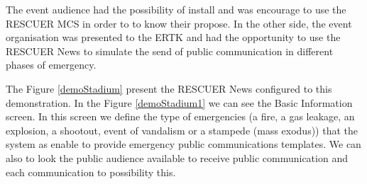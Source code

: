 The event audience had the possibility of install and was encourage to use the RESCUER MCS  in order to to know their propose. In the other side, the event organisation was presented to the ERTK and had the opportunity to use the RESCUER News to simulate the send of public communication in different phases of emergency. 

The Figure \ref{demoStadium} present the RESCUER News configured to this demonstration. In the Figure \ref{demoStadium1} we can see the Basic Information screen. In this screen we define the type of emergencies (a fire, a gas leakage, an explosion, a shootout, event of vandalism or a stampede (mass exodus)) that the system as enable to provide emergency public communications templates. We can also to look the public audience available to receive public communication and each communication to possibility this. 


